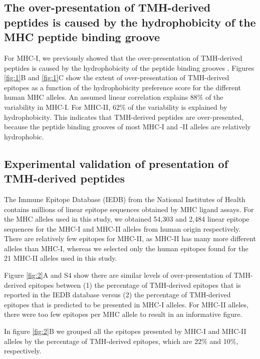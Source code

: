 \documentclass[utf8]{frontiersSCNS} %
\begin{document}
\subsection{The over-presentation of TMH-derived peptides is caused by the hydrophobicity of the MHC peptide binding groove}

For MHC-I, we previously showed that the over-presentation of TMH-derived 
peptides is caused by the hydrophobicity of the peptide binding 
grooves \citep{bianchi2017}. 
Figures \ref{fig:1}B and \ref{fig:1}C
show the extent of over-presentation
of TMH-derived epitopes as a function of the hydrophobicity preference score 
for the different human MHC alleles.
An assumed linear correlation explains 88\% of the variability in MHC-I.
For MHC-II, 62\% of the variability is explained by hydrophobicity. 
This indicates that TMH-derived peptides are over-presented, 
because the peptide binding grooves of most MHC-I and -II alleles 
are relatively hydrophobic.

\subsection{Experimental validation of presentation of TMH-derived peptides}

The Immune Epitope Database (IEDB) from the National Institutes of Health contains millions of linear epitope sequences obtained
by MHC ligand assays.
For the MHC alleles used in this study, 
we obtained 54,303 and 2,484 linear epitope sequences for the MHC-I
and MHC-II alleles from human origin respectively.
There are relatively few epitopes for MHC-II, 
as MHC-II has many more different alleles than MHC-I,
whereas we selected only the human epitopes found for the 21 MHC-II alleles used in this study.

Figure \ref{fig:2}A and S4 show there are similar levels of
over-presentation of TMH-derived epitopes between (1) the
percentage of TMH-derived epitopes that is reported in the IEDB database
versus (2) the percentage of TMH-derived epitopes that is predicted to be presented
in MHC-I alleles.
For MHC-II alleles, there were too few epitopes per MHC allele
to result in an informative figure. 

In figure \ref{fig:2}B we grouped all the epitopes 
presented by MHC-I and MHC-II alleles 
by the percentage of TMH-derived epitopes,
which are 22\% and 10\%, respectively.
\end{document}
